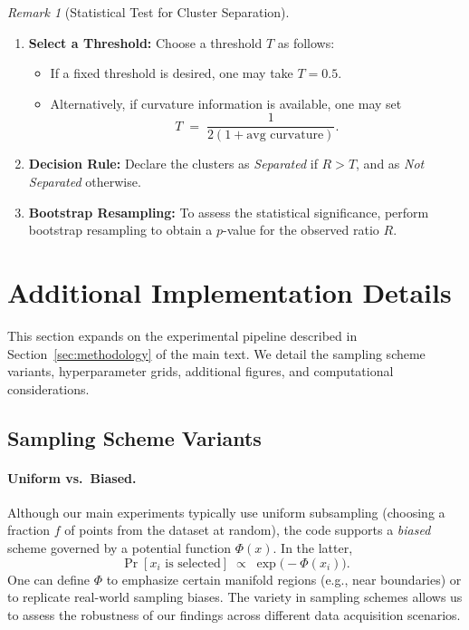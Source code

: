 \documentclass{article}
\theoremstyle{plain}
\theoremstyle{definition}
\theoremstyle{remark}
\newtheorem{remark}[theorem]{Remark}
\begin{document}
\begin{remark}[Statistical Test for Cluster Separation]
\begin{enumerate}
    \item \textbf{Select a Threshold:}  
    Choose a threshold $T$ as follows:
    \begin{itemize}
        \item If a fixed threshold is desired, one may take $T=0.5$.
        \item Alternatively, if curvature information is available, one may set
        \[
        T \;=\; \frac{1}{2(1+\text{avg curvature})}.
        \]
    \end{itemize}
    
    \item \textbf{Decision Rule:}  
    Declare the clusters as \emph{Separated} if $R > T$, and as \emph{Not Separated} otherwise.
    
    \item \textbf{Bootstrap Resampling:}  
    To assess the statistical significance, perform bootstrap resampling to obtain a $p$-value for the observed ratio $R$.
\end{enumerate}
\end{remark}


\newpage

\section{Additional Implementation Details}
\label{app:sampling-details}

This section expands on the experimental pipeline described in Section~\ref{sec:methodology} of the main text. We detail the sampling scheme variants, hyperparameter grids, additional figures, and computational considerations.

\subsection{Sampling Scheme Variants}
\label{app:sampling-details-actual}

\paragraph{Uniform vs.\ Biased.}
Although our main experiments typically use uniform subsampling (choosing a fraction $f$ of points from the dataset at random), the code supports a \emph{biased} scheme governed by a potential function $\Phi(x)$. In the latter,
$$
\Pr[x_i\text{ is selected}] \;\propto\; \exp\bigl(-\Phi(x_i)\bigr).
$$
One can define $\Phi$ to emphasize certain manifold regions (e.g., near boundaries) or to replicate real-world sampling biases. The variety in sampling schemes allows us to assess the robustness of our findings across different data acquisition scenarios.
\end{document}
